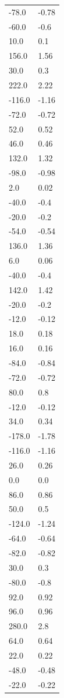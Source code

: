 \begin{longtable}{ll}
-78.0 & -0.78 \\
-60.0 & -0.6 \\
10.0 & 0.1 \\
156.0 & 1.56 \\
30.0 & 0.3 \\
222.0 & 2.22 \\
-116.0 & -1.16 \\
-72.0 & -0.72 \\
52.0 & 0.52 \\
46.0 & 0.46 \\
132.0 & 1.32 \\
-98.0 & -0.98 \\
2.0 & 0.02 \\
-40.0 & -0.4 \\
-20.0 & -0.2 \\
-54.0 & -0.54 \\
136.0 & 1.36 \\
6.0 & 0.06 \\
-40.0 & -0.4 \\
142.0 & 1.42 \\
-20.0 & -0.2 \\
-12.0 & -0.12 \\
18.0 & 0.18 \\
16.0 & 0.16 \\
-84.0 & -0.84 \\
-72.0 & -0.72 \\
80.0 & 0.8 \\
-12.0 & -0.12 \\
34.0 & 0.34 \\
-178.0 & -1.78 \\
-116.0 & -1.16 \\
26.0 & 0.26 \\
0.0 & 0.0 \\
86.0 & 0.86 \\
50.0 & 0.5 \\
-124.0 & -1.24 \\
-64.0 & -0.64 \\
-82.0 & -0.82 \\
30.0 & 0.3 \\
-80.0 & -0.8 \\
92.0 & 0.92 \\
96.0 & 0.96 \\
280.0 & 2.8 \\
64.0 & 0.64 \\
22.0 & 0.22 \\
-48.0 & -0.48 \\
-22.0 & -0.22 \\

\end{longtable}
